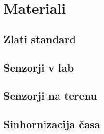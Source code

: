 \section{Materiali}
\subsection{Zlati standard}
\subsection{Senzorji v lab}
\subsection{Senzorji na terenu}
\subsection{Sinhornizacija časa}


